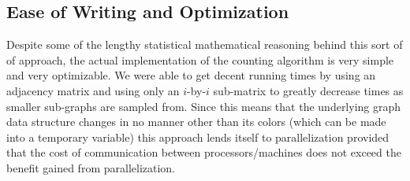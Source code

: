 \documentclass[14]{article}
\begin{document}
\subsection{Ease of Writing and Optimization}
Despite some of the lengthy statistical mathematical reasoning behind this sort of of approach, the actual implementation of the counting algorithm is very simple and very optimizable. We were able to get decent running times by using an adjacency matrix and using only an $i$-by-$i$ sub-matrix to greatly decrease times as smaller sub-graphs are sampled from. Since this means that the underlying graph data structure changes in no manner other than its colors (which can be made into a temporary variable) this approach lends itself to parallelization provided that the cost of communication between processors/machines does not exceed the benefit gained from parallelization.
\end{document}
